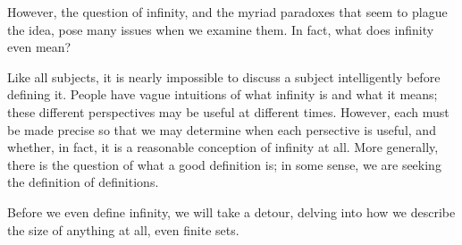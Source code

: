 However, the question of infinity, and the myriad paradoxes that seem to plague the idea, pose many issues when we examine them.
In fact, what does infinity even mean?

Like all subjects, it is nearly impossible to discuss a subject intelligently before defining it.
People have vague intuitions of what infinity is and what it means; these different perspectives may be useful at different times.
However, each must be made precise so that we may determine when each persective is useful, and whether, in fact, it is a reasonable conception of infinity at all.
More generally, there is the question of what a good definition is; in some sense, we are seeking the definition of definitions.


Before we even define infinity, we will take a detour, delving into how we describe the size of anything at all, even finite sets.

